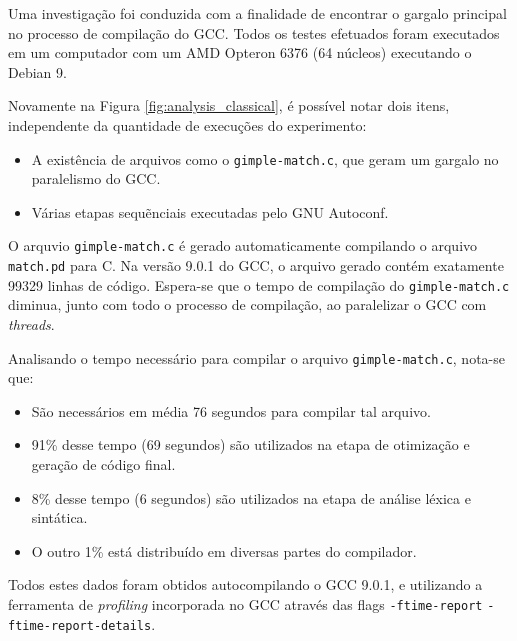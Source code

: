 Uma investigação foi conduzida com a finalidade de encontrar o gargalo
principal no processo de compilação do GCC. Todos os testes efetuados foram
executados em um computador com um AMD Opteron 6376 (64 núcleos) executando
o Debian 9.

Novamente na Figura \ref{fig:analysis_classical}, é possível notar dois
itens, independente da quantidade de execuções do experimento:

\begin{itemize}
    \item A existência de arquivos como o \texttt{gimple-match.c}, que
        geram um gargalo no paralelismo do GCC.

    \item Várias etapas sequẽnciais executadas pelo GNU Autoconf.
\end{itemize}

O arquvio \texttt{gimple-match.c} é gerado automaticamente compilando
o arquivo \texttt{match.pd} para C. Na versão 9.0.1 do GCC, o arquivo
gerado contém exatamente 99329 linhas de código. Espera-se que o tempo
de compilação do \texttt{gimple-match.c} diminua, junto com todo o
processo de compilação, ao paralelizar o GCC com \textit{threads}.

Analisando o tempo necessário para compilar o arquivo \texttt{gimple-match.c},
nota-se que:
\begin{itemize}
    \item São necessários em média 76 segundos para compilar tal arquivo.

    \item 91\% desse tempo (69 segundos) são utilizados na etapa de otimização
        e geração de código final.

    \item 8\% desse tempo (6 segundos) são utilizados na etapa de análise léxica
        e sintática.

    \item O outro 1\% está distribuído em diversas partes do compilador.
\end{itemize}
Todos estes dados foram obtidos autocompilando o GCC 9.0.1, e utilizando a 
ferramenta de \textit{profiling} incorporada
no GCC através das flags \texttt{-ftime-report} \texttt{-ftime-report-details}.

